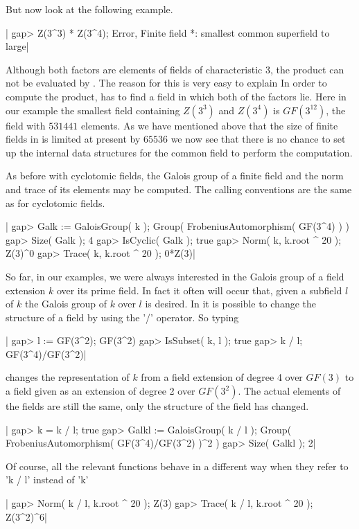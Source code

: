 But now look at the following example.

|    gap> Z(3^3) * Z(3^4);
    Error, Finite field *: smallest common superfield to large|

Although both factors are elements  of  fields of  characteristic 3,  the
product can not be evaluated by {\GAP}.  The reason for this is very easy
to explain\: In order to compute the product, {\GAP} has  to find a field
in which both of the factors lie.  Here in our example the smallest field
containing $Z(3^3)$ and $Z(3^4)$ is $GF(3^{12})$, the field with $531441$
elements.  As we have mentioned above that the  size of finite  fields in
{\GAP}  is limited  at present by  $65536$ we  now see  that there  is no
chance to set up the internal  data structures  for the  common  field to
perform the computation.

As before with cyclotomic fields,  the Galois group of a finite field and
the  norm  and  trace of  its  elements  may  be  computed.  The  calling
conventions are the same as for cyclotomic fields.

|    gap> Galk := GaloisGroup( k );
    Group( FrobeniusAutomorphism( GF(3^4) ) )
    gap> Size( Galk );
    4
    gap> IsCyclic( Galk );
    true
    gap> Norm( k, k.root ^ 20 );
    Z(3)^0
    gap> Trace( k, k.root ^ 20 );
    0*Z(3)|

So far, in our examples, we were always interested in the Galois group of
a field extension $k$ over its prime field.  In fact it often  will occur
that, given a subfield $l$  of  $k$ the Galois  group of $k$  over $l$ is
desired.  In {\GAP} it is possible  to change the structure of a field by
using the '/' operator.  So typing

|    gap> l := GF(3^2);
    GF(3^2)
    gap> IsSubset( k, l );
    true
    gap> k / l;
    GF(3^4)/GF(3^2)|

changes the representation of $k$ from a field extension of degree 4 over
$GF(3)$ to a field given as an extension of degree 2 over $GF(3^2)$.  The
actual elements of the fields are still the same, only  the  structure of
the field has changed.

|    gap> k = k / l;
    true
    gap> Galkl := GaloisGroup( k / l );
    Group( FrobeniusAutomorphism( GF(3^4)/GF(3^2) )^2 )
    gap> Size( Galkl );
    2|

Of course, all the relevant functions behave in a different way when they
refer to 'k / l' instead of 'k'

|    gap> Norm( k / l, k.root ^ 20 );
    Z(3)
    gap> Trace( k / l, k.root ^ 20 );
    Z(3^2)^6|

